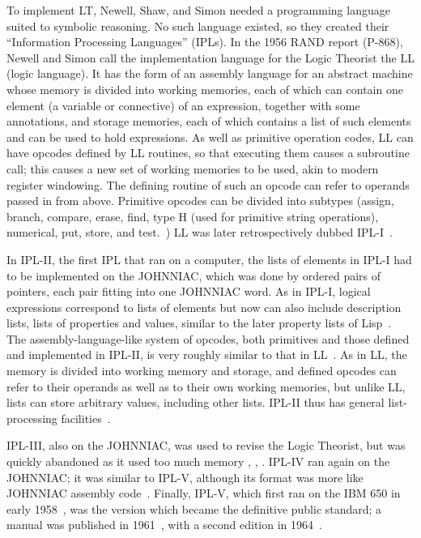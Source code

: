 \documentclass{IEEEcsmag}
\begin{document}
To implement LT, Newell, Shaw, and Simon needed a programming language
suited to symbolic reasoning. No such language existed, so they
created their ``Information Processing Languages'' (IPLs). 
In the 1956 RAND report (P-868), Newell and Simon call the implementation
language for the Logic Theorist the LL (logic language). It has the
form of an assembly language for an abstract machine whose memory
is divided into working memories, each of which can contain one
element (a variable or connective) of an expression, together with
some annotations, and storage memories, each of which contains a
list of such elements and can be used to hold expressions.  As well
as primitive operation codes, LL can have opcodes defined by LL
routines, so that executing them causes a subroutine call; this
causes a new set of working memories to be used, akin to modern register
windowing. The defining routine of such an opcode can refer to
operands passed in from above. Primitive opcodes can be divided
into subtypes (assign, branch, compare, erase, find, type H (used
for primitive string operations), numerical, put, store, and
test.~\cite{LT1956b}) LL was later retrospectively dubbed
IPL-I~\cite[p.~166]{mccorduck2004machines}.

In IPL-II, the first IPL that ran on a computer, the lists of elements
in IPL-I had to be implemented on the JOHNNIAC, which was done by ordered pairs
of pointers, each pair fitting into one JOHNNIAC word.
As in IPL-I, logical expressions correspond to
lists of elements but now can also include description lists,
lists of properties and values, similar to the later property
lists of Lisp~\cite{newellshaw1957}.  The assembly-language-like system of opcodes,
both primitives and those defined and implemented in IPL-II,
is very roughly similar to that in LL~\cite{notes1957}.
As in LL, the memory is
divided into working memory and storage, and defined opcodes
can refer to their operands as well as to their own working
memories, but unlike LL, lists can store arbitrary values,
including other lists. IPL-II thus has general list-processing
facilities~\cite{newellshaw1957}.

IPL-III, also on the JOHNNIAC, was used to
revise the Logic Theorist, but was quickly abandoned
as it used too much memory
\cite[p.~xxi]{newell1964ipl}, \cite[p.~II-18]{cip16june1958},
\cite{cip61957}.
IPL-IV ran again on the JOHNNIAC; it was similar to IPL-V,
although its format was more like JOHNNIAC assembly code~\cite{cip16june1958}.
Finally, IPL-V, which first ran on the IBM 650 in early 1958~\cite{DOC1963,iplv1986},
was the version which became the definitive public standard; a manual
was published in 1961~\cite{newell1961ipl}, with a second edition in
1964~\cite{newell1964ipl}.
\end{document}
